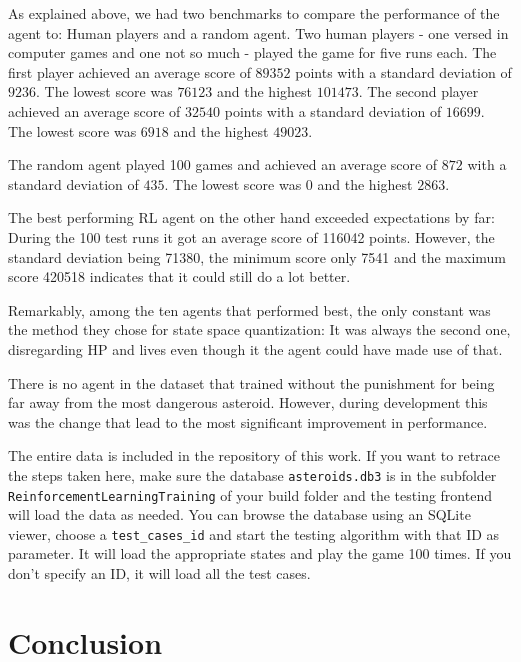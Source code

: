 \documentclass[a4paper,10pt]{article}
\begin{document}

As explained above, we had two benchmarks to compare the performance of the agent to: Human players and a random agent.
Two human players - one versed in computer games and one not so much - played the game for five runs each.
The first player achieved an average score of $89352$ points with a standard deviation of $9236$. The lowest score was $76123$ and the highest $101473$.
The second player achieved an average score of $32540$ points with a standard deviation of $16699$. The lowest score was $6918$ and the highest $49023$.

The random agent played 100 games and achieved an average score of $872$ with a standard deviation of $435$. The lowest score was $0$ and the highest $2863$.

The best performing RL agent on the other hand exceeded expectations by far: During the 100 test runs it got an average score of 116042 points.
However, the standard deviation being 71380, the minimum score only 7541 and the maximum score 420518 indicates that it could still do a lot better.

Remarkably, among the ten agents that performed best, the only constant was the method they chose for state space quantization: It was always the second one, disregarding HP and lives even though it the agent could have made use of that.

There is no agent in the dataset that trained without the punishment for being far away from the most dangerous asteroid. 
However, during development this was the change that lead to the most significant improvement in performance.

The entire data is included in the repository of this work. If you want to retrace the steps taken here, make sure the database \texttt{asteroids.db3} is in the subfolder \texttt{ReinforcementLearningTraining} of your build folder and the testing frontend will load the data as needed.
You can browse the database using an SQLite viewer, choose a \texttt{test\_cases\_id} and start the testing algorithm with that ID as parameter.
It will load the appropriate states and play the game 100 times. If you don't specify an ID, it will load all the test cases.

\section{Conclusion}
\end{document}
